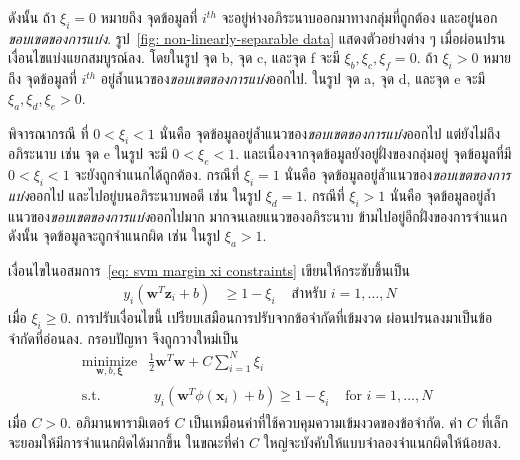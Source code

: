 ดังนั้น ถ้า $\xi_i = 0$ หมายถึง จุดข้อมูลที่ $i^{th}$ จะอยู่ห่างอภิระนาบออกมาทางกลุ่มที่ถูกต้อง และอยู่นอก\textit{ขอบเขตของการแบ่ง}.
รูป~\ref{fig: non-linearly-separable data} แสดงตัวอย่างต่าง ๆ เมื่อผ่อนปรนเงื่อนไขแบ่งแยกสมบูรณ์ลง.
โดยในรูป จุด b, จุด c, และจุด f จะมี $\xi_b, \xi_c, \xi_f = 0$.
ถ้า $\xi_i > 0$ หมายถึง จุดข้อมูลที่ $i^{th}$ อยู่ล้ำแนวของ\textit{ขอบเขตของการแบ่ง}ออกไป.
ในรูป จุด a, จุด d, และจุด e จะมี $\xi_a, \xi_d, \xi_e > 0$.

พิจารณากรณี ที่ $0 < \xi_i < 1$ นั่นคือ จุดข้อมูลอยู่ล้ำแนวของ\textit{ขอบเขตของการแบ่ง}ออกไป
แต่ยังไม่ถึงอภิระนาบ
เช่น จุด e ในรูป จะมี $0 < \xi_e < 1$. 
และเนื่องจากจุดข้อมูลยังอยู่ฝั่งของกลุ่มอยู่ จุดข้อมูลที่มี $0 < \xi_i < 1$ จะยังถูกจำแนกได้ถูกต้อง.
กรณีที่ $\xi_i = 1$ นั่นคือ จุดข้อมูลอยู่ล้ำแนวของ\textit{ขอบเขตของการแบ่ง}ออกไป
และไปอยู่บนอภิระนาบพอดี
เช่น ในรูป $\xi_d = 1$.
กรณีที่ $\xi_i > 1$
นั่นคือ จุดข้อมูลอยู่ล้ำแนวของ\textit{ขอบเขตของการแบ่ง}ออกไปมาก
มากจนเลยแนวของอภิระนาบ ข้ามไปอยู่อีกฝั่งของการจำแนก
ดังนั้น จุดข้อมูลจะถูกจำแนกผิด
เช่น ในรูป $\xi_a > 1$.

เงื่อนไขในอสมการ~\ref{eq: svm margin xi constraints} เขียนให้กระชับขึ้นเป็น
\begin{eqnarray}
y_i \left( \bm{w}^T \bm{z}_i + b \right) &\geq 1 - \xi_i & \mbox{ สำหรับ } i = 1, \ldots, N
\label{eq: svm margin xi concise}
\end{eqnarray}
เมื่อ $\xi_i \geq 0$.
การปรับเงื่อนไขนี้ เปรียบเสมือนการปรับจากข้อจำกัดที่เข้มงวด ผ่อนปรนลงมาเป็นข้อจำกัดที่อ่อนลง.
กรอบปัญหา จึงถูกวางใหม่เป็น
\begin{eqnarray}
\underset{\bm{w}, b, \bm{\xi}}{\mathrm{minimize}} &  \frac{1}{2} \bm{w}^T \bm{w} + C \sum_{i=1}^N \xi_i
\nonumber \\
\mbox{s.t.} & 
\begin{array}{ll}
y_i \left( \bm{w}^T \phi(\bm{x}_i) + b \right) \geq 1 - \xi_i & \mbox{ for } i =1, \ldots, N
\end{array}
\label{eq: csvm primal}
\end{eqnarray}
เมื่อ $C > 0$.
อภิมานพารามิเตอร์ $C$ เป็นเหมือนค่าที่ใช้ควบคุมความเข้มงวดของข้อจำกัด.
ค่า $C$ ที่เล็กจะยอมให้มีการจำแนกผิดได้มากขึ้น ในขณะที่ค่า $C$ ใหญ่จะบังคับให้แบบจำลองจำแนกผิดให้น้อยลง.

